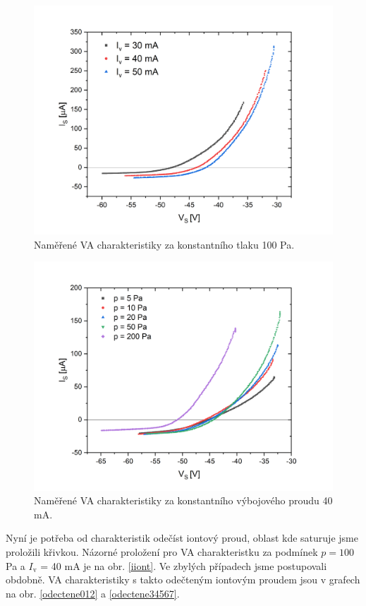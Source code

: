 \documentclass[a4paper,12pt]{article}
\begin{document}
\begin{figure}[h!]
	\centering
	\includegraphics[width=145mm]{namerene012.png}
	\caption{Naměřené VA charakteristiky za konstantního tlaku 100 \si{\pascal}.}
	\label{namerene012}	
\end{figure}

\begin{figure}[h!]
	\centering
	\includegraphics[width=145mm]{namerene34567.png}
	\caption{Naměřené VA charakteristiky za konstantního výbojového proudu 40 \si{\milli\ampere}.}
	\label{namerene34567}
\end{figure}

\newpage
Nyní je potřeba od charakteristik odečíst iontový proud, oblast kde saturuje jsme proložili křivkou. Názorné proložení pro VA
charakteristku za podmínek $p = 100$ \si{\pascal} a $I_\text{v}$ = 40 \si{\milli\ampere} je na obr. \ref{iiont}. Ve zbylých případech
jsme postupovali obdobně. VA charakteristiky s takto odečteným iontovým proudem jsou v grafech na obr. \ref{odectene012} a
\ref{odectene34567}.
\end{document}
